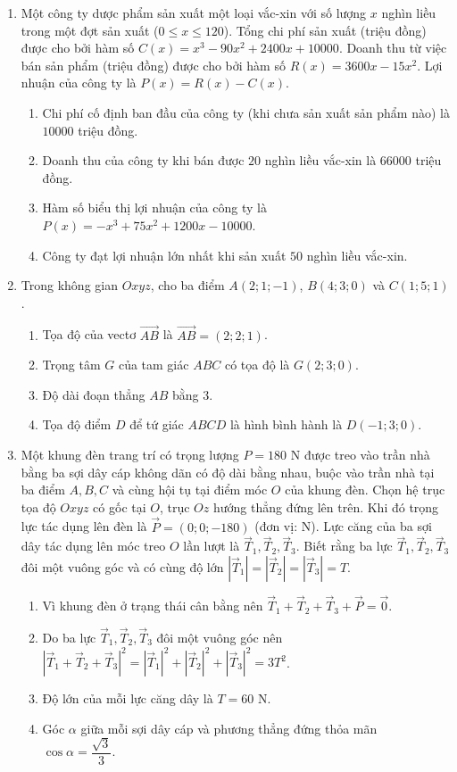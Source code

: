 \documentclass[12pt,a4paper]{article}
\begin{document}
\newpage
\begin{enumerate}[start=2]
\item Một công ty dược phẩm sản xuất một loại vắc-xin với số lượng $x$ nghìn liều trong một đợt sản xuất ($0\le x\le 120$). Tổng chi phí sản xuất (triệu đồng) được cho bởi hàm số $C(x)=x^3-90x^2+2400x+10000$. Doanh thu từ việc bán sản phẩm (triệu đồng) được cho bởi hàm số $R(x)=3600x-15x^2$. Lợi nhuận của công ty là $P(x)=R(x)-C(x)$.
\begin{enumerate}
\item Chi phí cố định ban đầu của công ty (khi chưa sản xuất sản phẩm nào) là $10000$ triệu đồng.
\item Doanh thu của công ty khi bán được $20$ nghìn liều vắc-xin là $66000$ triệu đồng.
\item Hàm số biểu thị lợi nhuận của công ty là $P(x)=-x^3+75x^2+1200x-10000$.
\item Công ty đạt lợi nhuận lớn nhất khi sản xuất $50$ nghìn liều vắc-xin.
\end{enumerate}

\item Trong không gian $Oxyz$, cho ba điểm $A(2;1;-1)$, $B(4;3;0)$ và $C(1;5;1)$.
\begin{enumerate}
\item Tọa độ của vectơ $\vec{AB}$ là $\vec{AB}=(2;2;1)$.
\item Trọng tâm $G$ của tam giác $ABC$ có tọa độ là $G(2;3;0)$.
\item Độ dài đoạn thẳng $AB$ bằng $3$.
\item Tọa độ điểm $D$ để tứ giác $ABCD$ là hình bình hành là $D(-1;3;0)$.
\end{enumerate}

\item Một khung đèn trang trí có trọng lượng $P=180\text{ N}$ được treo vào trần nhà bằng ba sợi dây cáp không dãn có độ dài bằng nhau, buộc vào trần nhà tại ba điểm $A, B, C$ và cùng hội tụ tại điểm móc $O$ của khung đèn. Chọn hệ trục tọa độ $Oxyz$ có gốc tại $O$, trục $Oz$ hướng thẳng đứng lên trên. Khi đó trọng lực tác dụng lên đèn là $\vec{P}=(0;0;-180)$ (đơn vị: N). Lực căng của ba sợi dây tác dụng lên móc treo $O$ lần lượt là $\vec{T}_1, \vec{T}_2, \vec{T}_3$. Biết rằng ba lực $\vec{T}_1, \vec{T}_2, \vec{T}_3$ đôi một vuông góc và có cùng độ lớn $|\vec{T}_1|=|\vec{T}_2|=|\vec{T}_3|=T$.
\begin{enumerate}
\item Vì khung đèn ở trạng thái cân bằng nên $\vec{T}_1+\vec{T}_2+\vec{T}_3+\vec{P}=\vec{0}$.
\item Do ba lực $\vec{T}_1, \vec{T}_2, \vec{T}_3$ đôi một vuông góc nên $|\vec{T}_1+\vec{T}_2+\vec{T}_3|^2=|\vec{T}_1|^2+|\vec{T}_2|^2+|\vec{T}_3|^2=3T^2$.
\item Độ lớn của mỗi lực căng dây là $T=60\text{ N}$.
\item Góc $\alpha$ giữa mỗi sợi dây cáp và phương thẳng đứng thỏa mãn $\cos\alpha=\dfrac{\sqrt{3}}{3}$.
\end{enumerate}
\end{enumerate}
\end{document}
